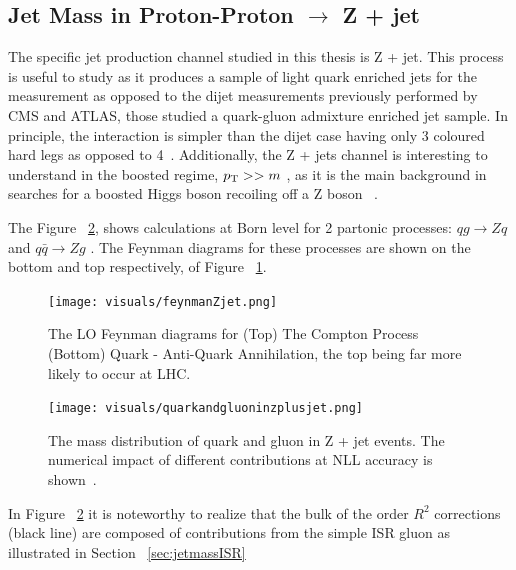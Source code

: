 

\subsection{Jet Mass in Proton-Proton $\rightarrow$ Z + jet }\label{sec:jetmass}

The specific jet production channel studied in this thesis is Z + jet. This process is useful to study as it produces a sample of light quark enriched jets for the measurement as opposed to the dijet measurements previously performed by CMS and ATLAS, those studied a quark-gluon admixture enriched jet sample. In principle, the interaction is simpler than the dijet case having only 3 coloured hard legs as opposed to 4~\cite{Marzani:2019hun}. Additionally, the Z + jets channel is interesting to understand in the boosted regime, $p_{\mathrm{T}} >> m$ , as it is the main background in searches for a boosted Higgs boson recoiling off a Z boson ~\cite{Marzani:2019hun}.





The Figure ~\ref{fig:quarkandgluoninzplusjet}, shows calculations at Born level for 2 partonic processes: $q g \rightarrow Z q$ and $q \bar{q} \rightarrow Z g $ . The Feynman diagrams for these processes are shown on the bottom and top respectively, of Figure ~\ref{fig:feynmanZjet}.

\begin{figure}[htb]
\centering
\texttt{[image: visuals/feynmanZjet.png]}
\caption{The LO Feynman diagrams for (Top) The Compton Process (Bottom) Quark - Anti-Quark Annihilation, the top being far more likely to occur at LHC. }
\label{fig:feynmanZjet}
\end{figure}

\begin{figure}[htb]
\centering
\texttt{[image: visuals/quarkandgluoninzplusjet.png]}
\caption{The mass distribution of quark and gluon in Z + jet events. The numerical impact of different contributions at NLL accuracy is shown~\cite{Marzani:2019hun}.  }
\label{fig:quarkandgluoninzplusjet}
\end{figure}


In Figure ~\ref{fig:quarkandgluoninzplusjet} it is noteworthy to realize that the bulk of the order $R^2$ corrections (black line) are composed of contributions from the simple ISR gluon as illustrated in Section ~\ref{sec:jetmassISR}



